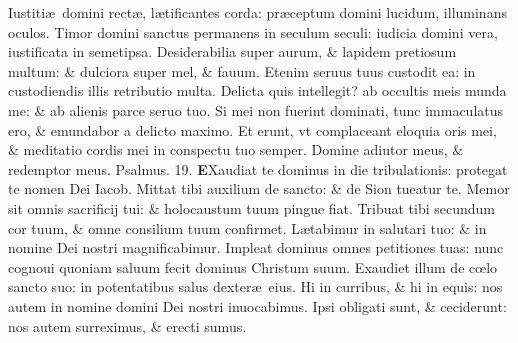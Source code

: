 \documentclass[a5paper,10pt]{book}
\def\ae{æ}
\def\oe{œ}
\begin{document}
\begin{multicols*}{2}
\newline \color{red} I\color{black}ustiti\ae \ domini rect\ae , l\ae tificantes corda: pr\ae ceptum domini lucidum, illuminans oculos.
\newline \color{red} T\color{black}imor domini sanctus permanens in seculum seculi: iudicia domini vera, iustificata in semetipsa.
\newline \color{red} D\color{black}esiderabilia super aurum, \& lapidem pretiosum multum: \& dulciora super mel, \& fauum.
\newline \color{red} E\color{black}tenim seruus tuus custodit ea: in custodiendis illis retributio multa.
\newline \color{red} D\color{black}elicta quis intellegit? ab occultis meis munda me: \& ab alienis parce seruo tuo.
\newline \color{red} S\color{black}i mei non fuerint dominati, tunc immaculatus ero, \& emundabor a delicto maximo.
\newline \color{red} E\color{black}t erunt, vt complaceant eloquia oris mei, \& meditatio cordis mei in conspectu tuo semper.
\newline \color{red} D\color{black}omine adiutor meus, \& redemptor meus. \quad \color{red} Psalmus. \hypertarget{ps19}{19.} \color{black}
\lettrine[lines=2]{\bfseries \color{red} E}{}Xaudiat te dominus in die tribulationis: protegat te nomen Dei Iacob.
\newline \color{red} M\color{black}ittat tibi auxilium de sancto: \& de Sion tueatur te.
\newline \color{red} M\color{black}emor sit omnis sacrificij tui: \& holocaustum tuum pingue fiat.
\newline \color{red} T\color{black}ribuat tibi secundum cor tuum, \& omne consilium tuum confirmet.
\newline \color{red} L\color{black}\ae tabimur in salutari tuo: \& in nomine Dei nostri magnificabimur.
\newline \color{red} I\color{black}mpleat dominus omnes petitiones tuas: nunc cognoui quoniam saluum fecit dominus Christum suum.
\newline \color{red} E\color{black}xaudiet illum de c\oe lo sancto suo: in potentatibus salus dexter\ae \ eius.
\newline \color{red} H\color{black}i in curribus, \& hi in equis: nos autem in nomine domini Dei nostri inuocabimus.
\newline \color{red} I\color{black}psi obligati sunt, \& ceciderunt: nos autem surreximus, \& erecti sumus.

\end{multicols*}
\end{document}
